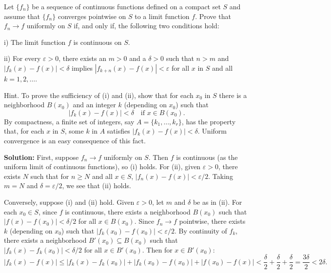 \begin{problembox}
Let \( \{f_n\} \) be a sequence of continuous functions defined on a compact set \( S \) and assume that \( \{f_n\} \) converges pointwise on \( S \) to a limit function \( f \). Prove that \( f_n \to f \) uniformly on \( S \) if, and only if, the following two conditions hold:

i) The limit function \( f \) is continuous on \( S \).

ii) For every \( \varepsilon > 0 \), there exists an \( m > 0 \) and a \( \delta > 0 \) such that \( n > m \) and \( |f_k(x) - f(x)| < \delta \) implies \( |f_{k+n}(x) - f(x)| < \varepsilon \) for all \( x \) in \( S \) and all \( k = 1, 2, \ldots \).

Hint. To prove the sufficiency of (i) and (ii), show that for each \( x_0 \) in \( S \) there is a neighborhood \( B(x_0) \) and an integer \( k \) (depending on \( x_0 \)) such that
\[|f_k(x) - f(x)| < \delta \quad \text{if } x \in B(x_0).\]
By compactness, a finite set of integers, say \( A = \{k_1, \ldots, k_r\} \), has the property that, for each \( x \) in \( S \), some \( k \) in \( A \) satisfies \( |f_k(x) - f(x)| < \delta \). Uniform convergence is an easy consequence of this fact.
\end{problembox}

\bigskip\noindent\textbf{Solution:} First, suppose \( f_n \to f \) uniformly on \( S \). Then \( f \) is continuous (as the uniform limit of continuous functions), so (i) holds. For (ii), given \( \varepsilon > 0 \), there exists \( N \) such that for \( n \geq N \) and all \( x \in S \), \( |f_n(x) - f(x)| < \varepsilon/2 \). Taking \( m = N \) and \( \delta = \varepsilon/2 \), we see that (ii) holds.

Conversely, suppose (i) and (ii) hold. Given \( \varepsilon > 0 \), let \( m \) and \( \delta \) be as in (ii). For each \( x_0 \in S \), since \( f \) is continuous, there exists a neighborhood \( B(x_0) \) such that \( |f(x) - f(x_0)| < \delta/2 \) for all \( x \in B(x_0) \). Since \( f_n \to f \) pointwise, there exists \( k \) (depending on \( x_0 \)) such that \( |f_k(x_0) - f(x_0)| < \varepsilon/2 \). By continuity of \( f_k \), there exists a neighborhood \( B'(x_0) \subseteq B(x_0) \) such that \( |f_k(x) - f_k(x_0)| < \delta/2 \) for all \( x \in B'(x_0) \). Then for \( x \in B'(x_0) \):
\[|f_k(x) - f(x)| \leq |f_k(x) - f_k(x_0)| + |f_k(x_0) - f(x_0)| + |f(x_0) - f(x)| < \frac{\delta}{2} + \frac{\delta}{2} + \frac{\delta}{2} = \frac{3\delta}{2} < 2\delta.\]

